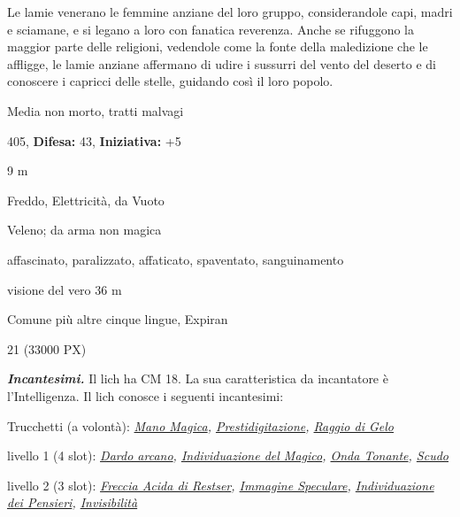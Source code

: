 \begin{multicols}{2}
{Le lamie venerano le femmine anziane del loro gruppo, considerandole capi, madri e sciamane, e si legano a loro con fanatica reverenza. Anche se rifuggono la maggior parte delle religioni, vedendole come la fonte della maledizione che le affligge, le lamie anziane affermano di udire i sussurri del vento del deserto e di conoscere i capricci delle stelle, guidando così il loro popolo.

\noindent
\begin{description}[noitemsep, topsep=0pt, parsep=0pt, partopsep=0pt, leftmargin=0cm, labelwidth=2.2cm]
	\item[\textbf{Taglia/Tipo:}] Media non morto, tratti malvagi
	\item[\textbf{Caratt.:}] 
	\item[\textbf{Punti Ferita:}] 405,  \textbf{Difesa:} 43,  \textbf{Iniziativa:} +5
	\item[\textbf{Movimento:}] 9 m
	\item[\textbf{Tiri Salvez.:}] 
	\item[\textbf{Res. Danni:}] Freddo, Elettricità, da Vuoto
	\item[\textbf{Imm. Danni:}] Veleno; da arma non magica
	\item[\textbf{Immunità:}] affascinato, paralizzato, affaticato, spaventato, sanguinamento
	\item[\textbf{Sensi:}] visione del vero 36 m
	\item[\textbf{Linguaggi:}] Comune più altre cinque lingue, Expiran
	\item[\textbf{Sfida:}] 21 (33000 PX)\smallskip
\end{description}

\emph{\textbf{Incantesimi.}} Il lich ha CM 18. La sua caratteristica da incantatore è l'Intelligenza. Il lich conosce i seguenti incantesimi:

Trucchetti (a volontà): \emph{\hyperlink{Mano Magica}{Mano Magica}, \hyperlink{Prestidigitazione}{Prestidigitazione}, \hyperlink{Raggio di Gelo}{Raggio di Gelo}}

livello 1 (4 slot): \emph{\hyperlink{Dardo arcano}{Dardo arcano}, \hyperlink{Individuazione del Magico}{Individuazione del Magico}, \hyperlink{Onda Tonante}{Onda Tonante}, \hyperlink{Scudo}{Scudo}}

livello 2 (3 slot): \emph{\hyperlink{Freccia Acida di Restser}{Freccia Acida di Restser}, \hyperlink{Immagine Speculare}{Immagine Speculare}, \hyperlink{Individuazione dei Pensieri}{Individuazione dei Pensieri}, \hyperlink{Invisibilità}{Invisibilità}}

}
\end{multicols}
